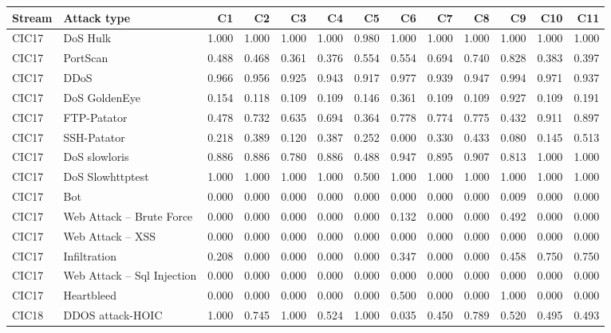\begin{table}[ht]\centering\scriptsize\setlength{\tabcolsep}{2.5pt}
\begin{tabular}{llrrrrrrrrrrr}
\hline
\textbf{Stream} & \textbf{Attack type} & \textbf{C1} & \textbf{C2} & \textbf{C3} & \textbf{C4} & \textbf{C5} & \textbf{C6} & \textbf{C7} & \textbf{C8} & \textbf{C9} & \textbf{C10} & \textbf{C11}\\
\hline
CIC17 & DoS Hulk & 1.000 & 1.000 & 1.000 & 1.000 & 0.980 & 1.000 & 1.000 & 1.000 & 1.000 & 1.000 & 1.000\\
CIC17 & PortScan & 0.488 & 0.468 & 0.361 & 0.376 & 0.554 & 0.554 & 0.694 & 0.740 & 0.828 & 0.383 & 0.397\\
CIC17 & DDoS & 0.966 & 0.956 & 0.925 & 0.943 & 0.917 & 0.977 & 0.939 & 0.947 & 0.994 & 0.971 & 0.937\\
CIC17 & DoS GoldenEye & 0.154 & 0.118 & 0.109 & 0.109 & 0.146 & 0.361 & 0.109 & 0.109 & 0.927 & 0.109 & 0.191\\
CIC17 & FTP-Patator & 0.478 & 0.732 & 0.635 & 0.694 & 0.364 & 0.778 & 0.774 & 0.775 & 0.432 & 0.911 & 0.897\\
CIC17 & SSH-Patator & 0.218 & 0.389 & 0.120 & 0.387 & 0.252 & 0.000 & 0.330 & 0.433 & 0.080 & 0.145 & 0.513\\
CIC17 & DoS slowloris & 0.886 & 0.886 & 0.780 & 0.886 & 0.488 & 0.947 & 0.895 & 0.907 & 0.813 & 1.000 & 1.000\\
CIC17 & DoS Slowhttptest & 1.000 & 1.000 & 1.000 & 1.000 & 0.500 & 1.000 & 1.000 & 1.000 & 1.000 & 1.000 & 1.000\\
CIC17 & Bot & 0.000 & 0.000 & 0.000 & 0.000 & 0.000 & 0.000 & 0.000 & 0.000 & 0.009 & 0.000 & 0.000\\
CIC17 & Web Attack -- Brute Force & 0.000 & 0.000 & 0.000 & 0.000 & 0.000 & 0.132 & 0.000 & 0.000 & 0.492 & 0.000 & 0.000\\
CIC17 & Web Attack -- XSS & 0.000 & 0.000 & 0.000 & 0.000 & 0.000 & 0.000 & 0.000 & 0.000 & 0.000 & 0.000 & 0.000\\
CIC17 & Infiltration & 0.208 & 0.000 & 0.000 & 0.000 & 0.000 & 0.347 & 0.000 & 0.000 & 0.458 & 0.750 & 0.750\\
CIC17 & Web Attack -- Sql Injection & 0.000 & 0.000 & 0.000 & 0.000 & 0.000 & 0.000 & 0.000 & 0.000 & 0.000 & 0.000 & 0.000\\
CIC17 & Heartbleed & 0.000 & 0.000 & 0.000 & 0.000 & 0.000 & 0.500 & 0.000 & 0.000 & 1.000 & 0.000 & 0.000\\
CIC18 & DDOS attack-HOIC & 1.000 & 0.745 & 1.000 & 0.524 & 1.000 & 0.035 & 0.450 & 0.789 & 0.520 & 0.495 & 0.493\\

\end{tabular}
\end{table}
